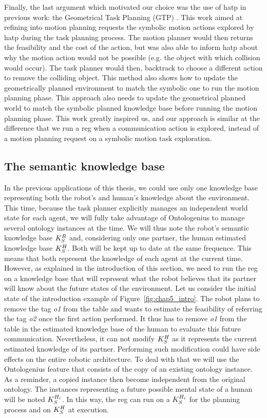 Finally, the last argument which motivated our choice was the use of \acrshort{hatp} in previous work: the Geometrical Task Planning (GTP) \cite{gharbi_2015_combining}. This work aimed at refining into motion planning requests the symbolic motion actions explored by \acrshort{hatp} during the task planning process. The motion planner would then returns the feasibility and the cost of the action, but was also able to inform \acrshort{hatp} about why the motion action would not be possible (e.g. the object with which collision would occur). The task planner would then, backtrack to choose a different action to remove the colliding object. This method also shows how to update the geometrically planned environment to match the symbolic one to run the motion planning phase. This approach also needs to update the geometrical planned world to match the symbolic planned knowledge base before running the motion planning phase. This work greatly inspired us, and our approach is similar at the difference that we run a \acrshort{reg} when a communication action is explored, instead of a motion planning request on a symbolic motion task exploration.

\subsection{The semantic knowledge base}

In the previous applications of this thesis, we could use only one knowledge base representing both the robot's and human's knowledge about the environment. This time, because the task planner explicitly manages an independent world state for each agent, we will fully take advantage of Ontologenius to manage several ontology instances at the time. We will thus note the robot's semantic knowledge base $K_S^R$ and, considering only one partner, the human estimated knowledge base $K_S^H$. Both will be kept up to date at the same frequence. This means that both represent the knowledge of each agent at the current time. However, as explained in the introduction of this section, we need to run the \acrshort{reg} on a knowledge base that will represent what the robot believes that its partner will know about the future states of the environment. Let us consider the initial state of the introduction example of Figure~\ref{fig:chap5_intro}. The robot plans to remove the tag \textit{o1} from the table and wants to estimate the feasibility of referring the tag \textit{o2} once the first action performed. It thus has to remove \textit{o1} from the table in the estimated knowledge base of the human to evaluate this future communication. Nevertheless, it can not modify $K_S^H$ as it represents the current estimated knowledge of its partner. Performing such modification could have side effects on the entire robotic architecture. To deal with that we will use the Ontologenius feature that consists of the copy of an existing ontology instance. As a reminder, a copied instance then become independent from the original ontology. The instances representing a future possible mental state of a human will be noted $K_S^{H_i}$. In this way, the \acrshort{reg} can run on a $K_S^{H_i}$ for the planning process and on $K_S^H$ at execution.

